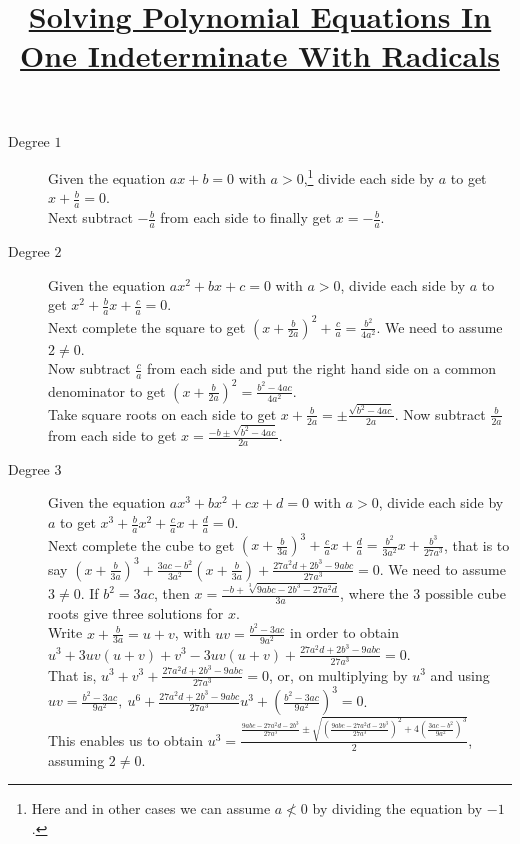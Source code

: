 \documentclass{article}
\title{\hspace*{-8mm}\underline{\bf Solving Polynomial Equations In One
Indeterminate With Radicals}}
\date{}
\newcommand\linear[2]{-\frac{#2}{#1}}
\newcommand\quadratic[3]{\frac{-#2\pm\sqrt{#2^2-4#1#3}}{2#1}}
\begin{document}
\maketitle
\vspace*{-20mm}
\begin{description}
\item[Degree $1$] Given the equation $ax+b=0$ with $a>0$,\footnote{Here
and in other cases we can assume $a\not<0$ by dividing the equation by
$-1$.} divide each side by $a$ to get $x+\frac ba=0$.\\
Next subtract $-\frac ba$ from each side to finally get $x=\linear
ab$.
\item[Degree $2$] Given the equation $ax^2+bx+c=0$ with $a>0$, divide each
side by $a$ to get $x^2+ \frac bax+\frac ca=0$.\\
Next complete the square to get $\left(x+\frac b{2a}\right)^2+
\frac ca=\frac{b^2}{4a^2}$. We need to assume $2\neq 0$.\\
Now subtract $\frac ca$ from each
side and put the right hand side on a common denominator to get
$\left(x+\frac b{2a}\right)^2=\frac{b^2-4ac}{4a^2}$.\\
Take square roots on each side to get $x+\frac b{2a}=\pm\frac{\sqrt{b^2-4ac}}
{2a}$. Now subtract $  \frac b{2a}$ from each side to get
$x=\quadratic abc$.
\item[Degree $3$] Given the equation $ax^3+bx^2+cx+d=0$ with
$a>0$, divide each side by $a$ to get $x^3+ \frac bax^2+\frac
cax+\frac da=0$.\\
Next complete the cube to get $(x+\frac b{3a})^3
+\frac cax+\frac da=\frac{b^2}{3a^2}x+\frac{b^3}{27a^3}$, that is
to say
$(x+\frac b{3a})^3+\frac
{3ac-b^2}{3a^2}(x+\frac b{3a})+\frac{27a^2d+2b^3-9abc}{27a^3}=0$.
We need to assume $3\neq 0$. If
$b^2=3ac$, then $x=\frac{-b+\sqrt[3]{9abc-2b^3-27a^2d}}{3a}$, where the
$3$ possible cube roots give three solutions for $x$.\\
Write $x+\frac b{3a}=u+v$, with $uv=\frac {b^2-3ac}{9a^2}$ in
order to obtain $u^3+3uv(u+v)+v^3-3uv(u+v)+\frac{27a^2d+2b^3-9abc}
{27a^3}=0$.\\
That is, $u^3+v^3+\frac{27a^2d+2b^3-9abc}{27a^3}=0$, or, on multiplying by $u^3$ and using $uv=\frac {b^2-3ac}{9a^2},\
u^6+\frac{27a^2d+2b^3-9abc}{27a^3}u^3+\left(\frac {b^2-3ac}{9a^2}
\right)^3=0$.\\
This enables us to obtain $u^3=\frac{\frac{9abc-27
a^2d-2b^3}{27a^3}\pm\sqrt{\left(\frac{9abc-27a^2d-2b^3}{27a^3}
\right)^2+4\left(\frac{3ac-b^2}{9a^2}\right)^3}}2$, assuming $2\neq 0$.\\

\end{description}
\end{document}
